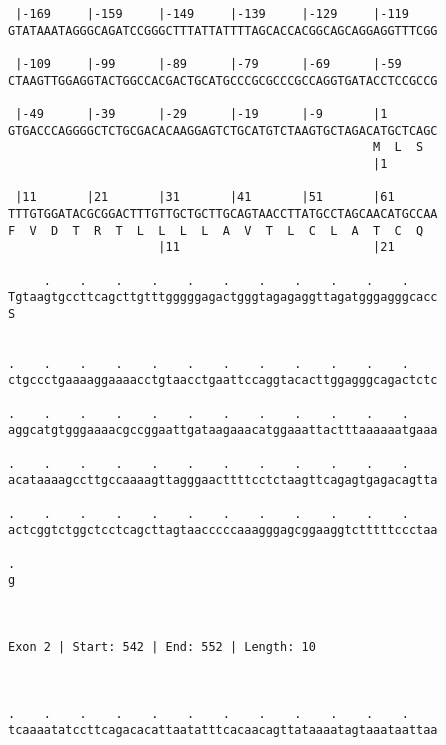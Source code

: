 \documentclass{article}
\begin{document}
\begin{Verbatim}
 |-169     |-159     |-149     |-139     |-129     |-119    
GTATAAATAGGGCAGATCCGGGCTTTATTATTTTAGCACCACGGCAGCAGGAGGTTTCGG
                                                            
 |-109     |-99      |-89      |-79      |-69      |-59     
CTAAGTTGGAGGTACTGGCCACGACTGCATGCCCGCGCCCGCCAGGTGATACCTCCGCCG
                                                            
 |-49      |-39      |-29      |-19      |-9       |1       
GTGACCCAGGGGCTCTGCGACACAAGGAGTCTGCATGTCTAAGTGCTAGACATGCTCAGC
                                                   M  L  S  
                                                   |1       
  
 |11       |21       |31       |41       |51       |61      
TTTGTGGATACGCGGACTTTGTTGCTGCTTGCAGTAACCTTATGCCTAGCAACATGCCAA
F  V  D  T  R  T  L  L  L  L  A  V  T  L  C  L  A  T  C  Q  
                     |11                           |21      
  
     .    .    .    .    .    .    .    .    .    .    .    
Tgtaagtgccttcagcttgtttgggggagactgggtagagaggttagatgggagggcacc
S                                                           
                                                            
  
.    .    .    .    .    .    .    .    .    .    .    .    
ctgccctgaaaaggaaaacctgtaacctgaattccaggtacacttggagggcagactctc
                                                            
.    .    .    .    .    .    .    .    .    .    .    .    
aggcatgtgggaaaacgccggaattgataagaaacatggaaattactttaaaaaatgaaa
                                                            
.    .    .    .    .    .    .    .    .    .    .    .    
acataaaagccttgccaaaagttagggaacttttcctctaagttcagagtgagacagtta
                                                            
.    .    .    .    .    .    .    .    .    .    .    .    
actcggtctggctcctcagcttagtaacccccaaagggagcggaaggtctttttccctaa
                                                            
.
g
 
 
 
Exon 2 | Start: 542 | End: 552 | Length: 10



.    .    .    .    .    .    .    .    .    .    .    .    
tcaaaatatccttcagacacattaatatttcacaacagttataaaatagtaaataattaa
                                                            

\end{Verbatim}
\end{document}

